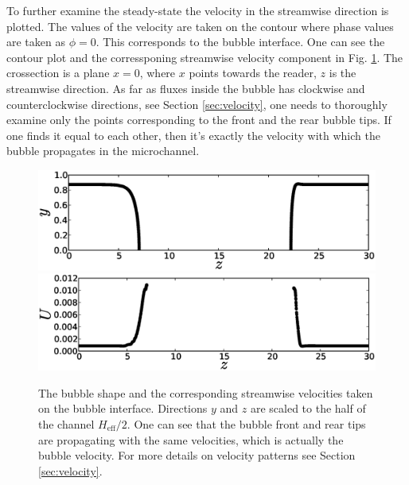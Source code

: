 \documentclass{article}
\begin{document}
To further examine the steady-state the velocity in the streamwise direction is plotted. The values
of the velocity are taken on the contour where phase values are taken as $\phi=0$. This corresponds
 to the bubble interface. One can see the contour plot and the corressponing streamwise velocity
component in Fig. \ref{fig:velocity:contour}. The crossection is a plane $x=0$, where $x$ points
towards the reader, $z$ is the streamwise direction. As far as fluxes inside the bubble has
clockwise and counterclockwise directions, see Section \ref{sec:velocity}, one needs to thoroughly
examine only the points corresponding to the front and the rear bubble tips. If one finds it equal
to each other, then it's exactly the velocity with which the bubble propagates in the microchannel. 
\begin{figure}[h!]
\includegraphics[width=\textwidth]{Figures/velocity_interface_contour.eps}\\
\includegraphics[width=\textwidth]{Figures/velocity_interface_values.eps}\\
\caption{The bubble shape and the corresponding streamwise velocities taken on the bubble
interface. Directions $y$ and $z$ are scaled to the half of the channel
$H_{\mathrm{eff}}/2$. One can see that the bubble front and rear tips are propagating with the
same velocities, which is actually the bubble velocity. For more details on velocity patterns
see Section \ref{sec:velocity}. \label{fig:velocity:contour}}
\end{figure}
\end{document}

